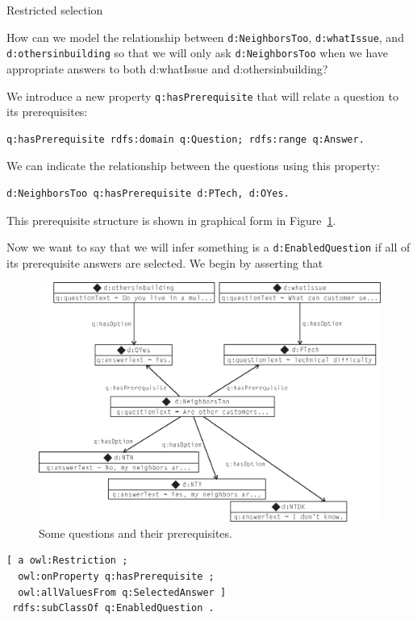 \begin{challenge}{Restricted selection}
\label{chal:26}

How can we model the relationship between \texttt{d:NeighborsToo}, \texttt{d:whatIssue},
and \texttt{d:othersinbuilding} so that we will only ask \texttt{d:NeighborsToo} when we
have appropriate answers to both d:whatIssue and d:othersinbuilding?

We introduce a new property \texttt{q:hasPrerequisite} that will relate a
question to its prerequisites:

\begin{lstlisting}
q:hasPrerequisite rdfs:domain q:Question; rdfs:range q:Answer.
\end{lstlisting}

We can indicate the relationship between the questions using this
property:

\begin{lstlisting}
d:NeighborsToo q:hasPrerequisite d:PTech, d:OYes.
\end{lstlisting}

This prerequisite structure is shown in graphical form in Figure~\ref{fig:ch12.07}.

Now we want to say that we will infer something is a \texttt{d:EnabledQuestion}
if all of its prerequisite answers are selected. We begin by asserting
that

\begin{figure}
\centering
\includegraphics[width=5in]{media/ch12/f12-07.eps}
\caption{Some questions and their prerequisites.}
\label{fig:ch12.07}
\end{figure}


\begin{lstlisting}
[ a owl:Restriction ;
  owl:onProperty q:hasPrerequisite ;
  owl:allValuesFrom q:SelectedAnswer ]
 rdfs:subClassOf q:EnabledQuestion .
\end{lstlisting}


\end{challenge}
